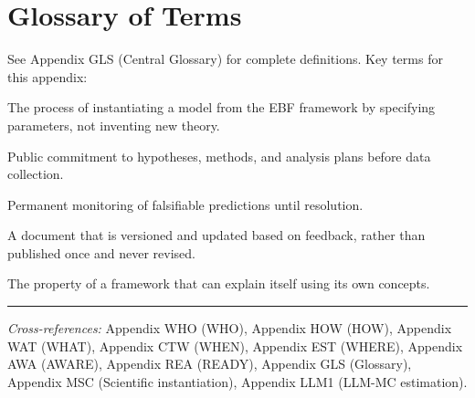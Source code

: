 
\section{Glossary of Terms}
\label{sec:apply-glossary}

See Appendix GLS (Central Glossary) for complete definitions. Key terms for
this appendix:

\begin{description}[nosep]
    \item[Derivation] The process of instantiating a model from the EBF framework
        by specifying parameters, not inventing new theory.
    \item[Pre-registration] Public commitment to hypotheses, methods, and analysis
        plans before data collection.
    \item[Prediction tracking] Permanent monitoring of falsifiable predictions
        until resolution.
    \item[Living document] A document that is versioned and updated based on
        feedback, rather than published once and never revised.
    \item[Reflexive validity] The property of a framework that can explain itself
        using its own concepts.
\end{description}



\vspace{1em}
\hrule
\vspace{0.5em}

\noindent\textit{Cross-references:}
Appendix WHO (WHO),
Appendix HOW (HOW),
Appendix WAT (WHAT),
Appendix CTW (WHEN),
Appendix EST (WHERE),
Appendix AWA (AWARE),
Appendix REA (READY),
Appendix GLS (Glossary),
Appendix MSC (Scientific instantiation),
Appendix LLM1 (LLM-MC estimation).




